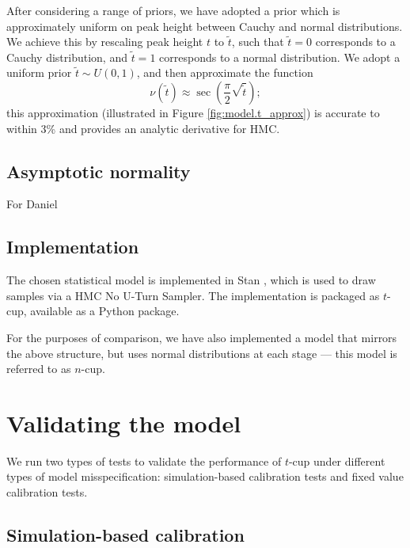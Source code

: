\documentclass[fleqn,usenatbib]{mnras}
\begin{document}
After considering a range of priors, we have adopted a prior which is
approximately uniform on peak height between Cauchy and normal distributions.
We achieve this by rescaling peak height $t$ to $\tilde{t}$, such that
$\tilde{t} = 0$ corresponds to a Cauchy distribution, and $\tilde{t} = 1$
corresponds to a normal distribution. We adopt a uniform prior $\tilde{t} \sim
U\left(0, 1\right)$, and then approximate the function
\begin{equation}
    \nu\left(\tilde{t}\right)
        \approx
    \sec \left(\frac{\pi}{2} \sqrt{\tilde{t}} \right);
    \label{eqn:model.t_approx}
\end{equation}
this approximation (illustrated in Figure \ref{fig:model.t_approx}) is accurate
to within 3\% and provides an analytic derivative for HMC.

\subsection{Asymptotic normality}
\label{sec:formalism.asymptotic}

{\color{green} For Daniel}

\subsection{Implementation}
\label{sec:formalism.implementation}

The chosen statistical model is implemented in Stan \citep{Stan}, which is used
to draw samples via a HMC No U-Turn Sampler. The implementation is packaged as
$t$-cup, available as a Python package\footnotemark.

For the purposes of comparison, we have also implemented a model that mirrors
the above structure, but uses normal distributions at each stage --- this model
is referred to as $n$-cup.


\section{Validating the model}
\label{sec:methods}

We run two types of tests to validate the performance of $t$-cup under different
types of model misspecification: simulation-based calibration tests
\citep{Cook:2006, Talts:2018} and fixed value calibration tests.

\subsection{Simulation-based calibration}
\label{sec:methods.sbc}
\end{document}
